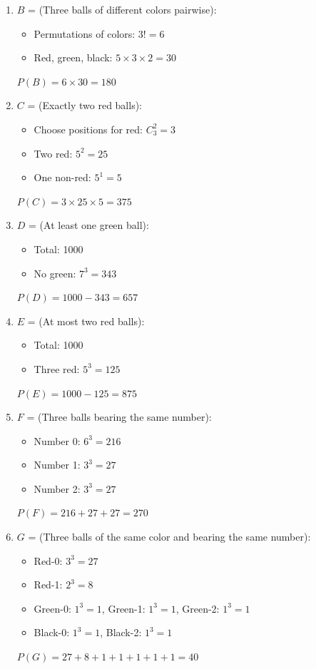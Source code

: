 \documentclass[12pt]{article}
\begin{document}
\begin{correctionbox}
\begin{enumerate}
    \item $B$ = (Three balls of different colors pairwise):
    \begin{itemize}
        \item Permutations of colors: $3! = 6$
        \item Red, green, black: $5 \times 3 \times 2 = 30$
    \end{itemize}
    $P(B) = 6 \times 30 = 180$
    
    \item $C$ = (Exactly two red balls):
    \begin{itemize}
        \item Choose positions for red: $C_3^2 = 3$
        \item Two red: $5^2 = 25$
        \item One non-red: $5^1 = 5$
    \end{itemize}
    $P(C) = 3 \times 25 \times 5 = 375$
    
    \item $D$ = (At least one green ball):
    \begin{itemize}
        \item Total: 1000
        \item No green: $7^3 = 343$
    \end{itemize}
    $P(D) = 1000 - 343 = 657$
    
    \item $E$ = (At most two red balls):
    \begin{itemize}
        \item Total: 1000
        \item Three red: $5^3 = 125$
    \end{itemize}
    $P(E) = 1000 - 125 = 875$
    
    \item $F$ = (Three balls bearing the same number):
    \begin{itemize}
        \item Number 0: $6^3 = 216$
        \item Number 1: $3^3 = 27$
        \item Number 2: $3^3 = 27$
    \end{itemize}
    $P(F) = 216 + 27 + 27 = 270$
    
    \item $G$ = (Three balls of the same color and bearing the same number):
    \begin{itemize}
        \item Red-0: $3^3 = 27$
        \item Red-1: $2^3 = 8$
        \item Green-0: $1^3 = 1$, Green-1: $1^3 = 1$, Green-2: $1^3 = 1$
        \item Black-0: $1^3 = 1$, Black-2: $1^3 = 1$
    \end{itemize}
    $P(G) = 27 + 8 + 1 + 1 + 1 + 1 + 1 = 40$
    

\end{enumerate}
\end{correctionbox}
\end{document}
